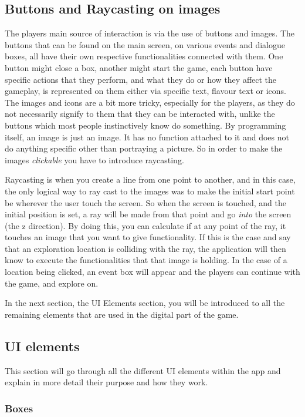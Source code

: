\subsection{Buttons and Raycasting on images}
The players main source of interaction is via the use of buttons and images. The buttons that can be found on the main screen, on various events and dialogue boxes, all have their own respective functionalities connected with them. One button might close a box, another might start the game, each button have specific actions that they perform, and what they do or how they affect the gameplay, is represented on them either via specific text, flavour text or icons.
The images and icons are a bit more tricky, especially for the players, as they do not necessarily signify to them that they can be interacted with, unlike the buttons which most people instinctively know do something.
By programming itself, an image is just an image. It has no function attached to it and does not do anything specific other than portraying a picture. So in order to make the images \textit{clickable} you have to introduce raycasting.

Raycasting is when you create a line from one point to another, and in this case, the only logical way to ray cast to the images was to make the initial start point be wherever the user touch the screen. So when the screen is touched, and the initial position is set, a ray will be made from that point and go \textit{into} the screen (the z direction). By doing this, you can calculate if at any point of the ray, it touches an image that you want to give functionality. If this is the case and say that an exploration location is colliding with the ray, the application will then know to execute the functionalities that that image is holding. In the case of a location being clicked, an event box will appear and the players can continue with the game, and explore on.

In the next section, the UI Elements section, you will be introduced to all the remaining elements that are used in the digital part of the game.

\subsection{UI elements}
This section will go through all the different UI elements within the app and explain in more detail their purpose and how they work.

\subsubsection{Boxes}


